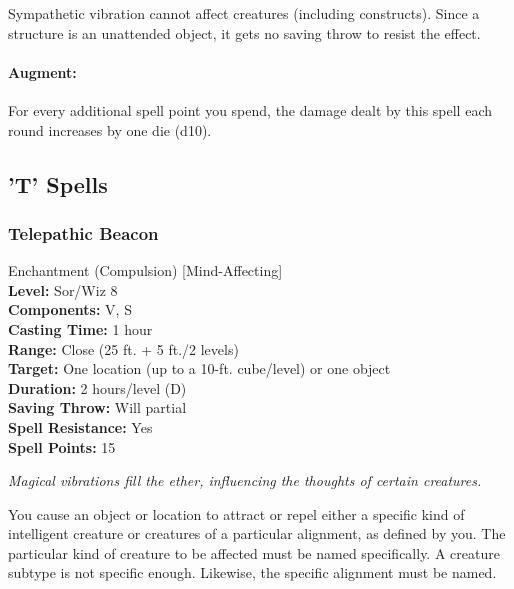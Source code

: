 Sympathetic vibration cannot affect creatures (including constructs). Since a structure is an unattended object, it gets no saving throw to resist the effect.

\paragraph{Augment:} For every additional spell point you spend, the damage dealt by this spell each round increases by one die (d10).
\subsection{'T' Spells}
\subsubsection{Telepathic Beacon}
\label{Spell:TelepathicBeacon}
Enchantment (Compulsion) [Mind-Affecting]
\\ \textbf{Level:} Sor/Wiz 8
\\ \textbf{Components:} V, S
\\ \textbf{Casting Time:} 1 hour
\\ \textbf{Range:} Close (25 ft. + 5 ft./2 levels)
\\ \textbf{Target:} One location (up to a 10-ft. cube/level) or one object
\\ \textbf{Duration:} 2 hours/level (D)
\\ \textbf{Saving Throw:} Will partial
\\ \textbf{Spell Resistance:} Yes
\\ \textbf{Spell Points:} 15

\emph{Magical vibrations fill the ether, influencing the thoughts of certain creatures.}

You cause an object or location to attract or repel either a specific kind of intelligent creature or creatures of a particular alignment, as defined by you. 
The particular kind of creature to be affected must be named specifically. 
A creature subtype is not specific enough. 
Likewise, the specific alignment must be named.

